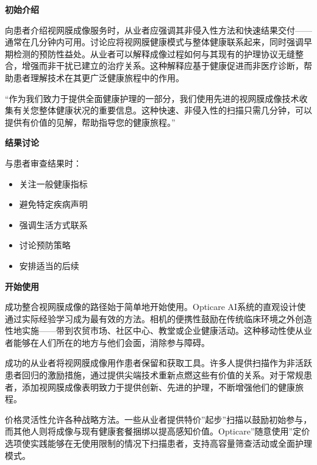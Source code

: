 \documentclass[
  Letterpaper,
]{scrbook}
\providecommand{\tightlist}{%
  \setlength{\itemsep}{0pt}\setlength{\parskip}{0pt}}\usepackage{longtable,booktabs,array}
\begin{document}
\textbf{初始介绍}

向患者介绍视网膜成像服务时，从业者应强调其非侵入性方法和快速结果交付------通常在几分钟内可用。讨论应将视网膜健康模式与整体健康联系起来，同时强调早期检测的预防性益处。从业者可以解释成像过程如何与其现有的护理协议无缝整合，增强而非干扰已建立的治疗关系。这种解释应基于健康促进而非医疗诊断，帮助患者理解技术在其更广泛健康旅程中的作用。

\begin{tcolorbox}[enhanced jigsaw, coltitle=black, rightrule=.15mm, colback=white, colbacktitle=quarto-callout-note-color!10!white, breakable, bottomtitle=1mm, opacityback=0, bottomrule=.15mm, titlerule=0mm, opacitybacktitle=0.6, left=2mm, colframe=quarto-callout-note-color-frame, title=\textcolor{quarto-callout-note-color}{\faInfo}\hspace{0.5em}{示例介绍脚本}, toptitle=1mm, toprule=.15mm, arc=.35mm, leftrule=.75mm]

``作为我们致力于提供全面健康护理的一部分，我们使用先进的视网膜成像技术收集有关您整体健康状况的重要信息。这种快速、非侵入性的扫描只需几分钟，可以提供有价值的见解，帮助指导您的健康旅程。''

\end{tcolorbox}

\textbf{结果讨论}

与患者审查结果时：

\begin{itemize}
\tightlist
\item
  关注一般健康指标
\item
  避免特定疾病声明
\item
  强调生活方式联系
\item
  讨论预防策略
\item
  安排适当的后续
\end{itemize}

\textbf{开始使用}

成功整合视网膜成像的路径始于简单地开始使用。Opticare
AI系统的直观设计使通过实际经验学习成为最有效的方法。相机的便携性鼓励在传统临床环境之外创造性地实施------带到农贸市场、社区中心、教堂或企业健康活动。这种移动性使从业者能够在人们所在的地方与他们会面，消除参与障碍。

成功的从业者将视网膜成像用作患者保留和获取工具。许多人提供扫描作为非活跃患者回归的激励措施，通过提供尖端技术重新点燃这些有价值的关系。对于常规患者，添加视网膜成像表明致力于提供创新、先进的护理，不断增强他们的健康旅程。

价格灵活性允许各种战略方法。一些从业者提供特价''起步''扫描以鼓励初始参与，而其他人则将成像与现有健康套餐捆绑以提高感知价值。Opticare''随意使用''定价选项使实践能够在无使用限制的情况下扫描患者，支持高容量筛查活动或全面护理模式。
\end{document}
